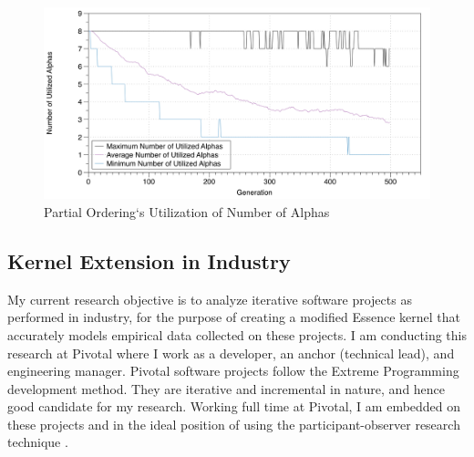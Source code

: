 \documentclass[preprint,12pt,3p]{elsarticle}
\begin{document}
\begin{figure}[ht]\vspace*{4pt}
\centerline{\includegraphics[width=5.00in]{genetic_programming/number_of_alphas_partial_ordering_500gens_40runs_8alpha}}
\caption{Partial Ordering`s Utilization of Number of Alphas}\vspace*{-6pt}
\label{NumberOfAlphasPartialOrdering}
\end{figure}


\subsection{Kernel Extension in Industry}
\label{PivotalKernelExtension}
My current research objective is to analyze iterative software projects as performed in industry, for the purpose of creating a modified Essence kernel that accurately models empirical data collected on these projects. I am conducting this research at Pivotal where I work as a developer, an anchor (technical lead), and engineering manager. Pivotal software projects follow the Extreme Programming \cite{ExtremeProgrammingExplained} development method. They are iterative and incremental in nature, and hence good candidate for my research. Working full time at Pivotal, I am embedded on these projects and in the ideal position of using the participant-observer research technique \cite{QualitativeMethods}. 
\end{document}

